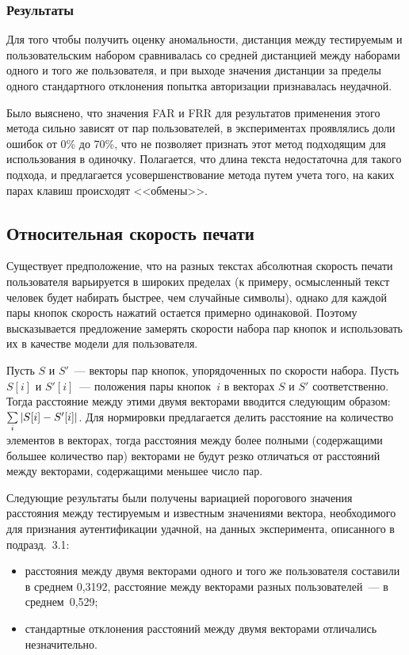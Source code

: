 \begin{multicols}{2}
\subsubsection{Результаты}

Для того чтобы получить оценку аномаль\-ности, дистанция между
тестируемым и пользовательским набором сравнивалась со средней
дистанцией между наборами одного и того же пользователя, и при выходе
значения дистанции за пределы одного стандартного отклонения попытка
авторизации признавалась неудачной.

Было выяснено, что значения FAR и FRR для результатов применения
этого метода сильно зависят от пар пользователей, в экспериментах
проявлялись доли ошибок от 0\% до 70\%, что не позволяет признать
этот метод подходящим для использования в одиночку. Полагается, что
длина текста недостаточна для такого подхода, и предлагается
усовершенствование метода путем учета того, на каких парах клавиш
происходят <<обмены>>.

\subsection{Относительная скорость печати}

Существует предположение, что на разных текстах абсолютная скорость
печати пользователя варь\-и\-ру\-ет\-ся в широких пределах (к примеру,
осмыс\-лен\-ный текст человек будет набирать быстрее, чем случайные
символы), однако для каждой пары кнопок скорость нажатий остается
примерно одинаковой. Поэтому высказывается предложение замерять
скорости набора пар кнопок и использовать их в качестве модели для
пользователя.

Пусть $S$ и $S'$~--- векторы пар кнопок, упорядоченных по скорости
набора. Пусть $S[i]$ и $S'[i]$~--- положения пары кнопок~$i$ в
векторах $S$ и $S'$ соответственно. Тогда расстояние между этими
двумя векторами вводится следующим образом: $\sum\limits_i |S[i] \hm-
S'[i]|$. Для нормировки предлагается делить расстояние на количество
элементов в векторах, тогда расстояния между более полными
(содержащими большее количество пар) векторами не будут резко
отличаться от расстояний между векторами, содержащими меньшее число
пар.

Следующие результаты были получены вариацией порогового значения
расстояния между тес\-ти\-ру\-емым и известным значениями вектора,
необходимого для признания аутентификации удачной, на данных
эксперимента, описанного в подразд.~3.1:
\begin{itemize}
    \item расстояния между двумя векторами одного и того же пользователя составили в 
    среднем 0,3192, расстояние между векторами разных пользователей~--- в среднем~0,529;
    \item стандартные отклонения расстояний между двумя векторами отличались незначительно.
\end{itemize}


\end{multicols}
